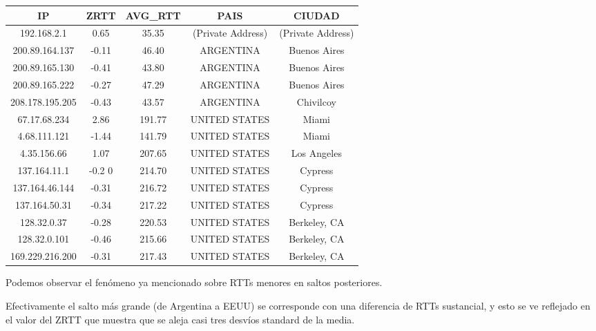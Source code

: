 \begin{tabular}{|c@{\hspace{5ex}}c@{\hspace{5ex}}c@{\hspace{5ex}}c@{\hspace{5ex}}c|}
 \hline
 \rule{0pt}{1.2em}IP & ZRTT & AVG\_RTT & PAIS & CIUDAD\\[0.2em]
 \hline

\rule{0pt}{1.2em} 192.168.2.1  &  0.65 & 35.35 & (Private Address) & (Private Address) \\[0.2em]
\rule{0pt}{1.2em} 200.89.164.137  &  -0.11 & 46.40 & ARGENTINA & Buenos Aires \\[0.2em]
\rule{0pt}{1.2em} 200.89.165.130  &  -0.41 & 43.80 & ARGENTINA & Buenos Aires \\[0.2em]
\rule{0pt}{1.2em} 200.89.165.222  &  -0.27 & 47.29 & ARGENTINA & Buenos Aires \\[0.2em]
\rule{0pt}{1.2em} 208.178.195.205  &  -0.43 & 43.57 & ARGENTINA & Chivilcoy \\[0.2em]
\rule{0pt}{1.2em} 67.17.68.234  &  2.86 & 191.77 & UNITED STATES & Miami \\[0.2em]
\rule{0pt}{1.2em} 4.68.111.121  &  -1.44 & 141.79 & UNITED STATES & Miami \\[0.2em]
\rule{0pt}{1.2em} 4.35.156.66  &  1.07 & 207.65 & UNITED STATES & Los Angeles \\[0.2em]
\rule{0pt}{1.2em} 137.164.11.1  &  -0.2 0& 214.70 & UNITED STATES & Cypress \\[0.2em]
\rule{0pt}{1.2em} 137.164.46.144  &  -0.31 & 216.72 & UNITED STATES & Cypress \\[0.2em]
\rule{0pt}{1.2em} 137.164.50.31  &  -0.34 & 217.22 & UNITED STATES & Cypress \\[0.2em]
\rule{0pt}{1.2em} 128.32.0.37  &  -0.28 & 220.53 & UNITED STATES & Berkeley, CA \\[0.2em]
\rule{0pt}{1.2em} 128.32.0.101  &  -0.46 & 215.66 & UNITED STATES & Berkeley, CA \\[0.2em]
\rule{0pt}{1.2em} 169.229.216.200  &  -0.31 & 217.43 & UNITED STATES & Berkeley, CA \\[0.2em]
\hline
 \end{tabular}

Podemos observar el fenómeno ya mencionado sobre RTTs menores en saltos posteriores.

Efectivamente el salto más grande (de Argentina a EEUU) se corresponde con una diferencia de RTTs sustancial, y esto se ve reflejado en el valor del ZRTT que muestra que se aleja casi tres desvíos standard de la media.

